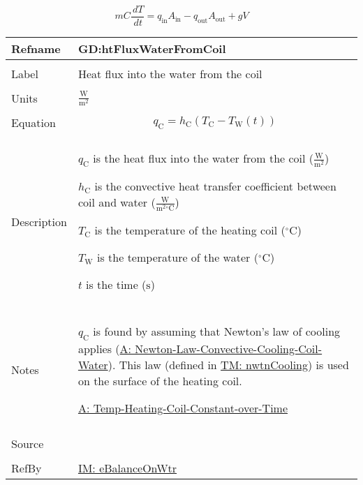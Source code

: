 \documentclass[12pt]{article}
\begin{document}
\begin{displaymath}
m C \frac{\,dT}{\,dt}={q_{\text{in}}} {A_{\text{in}}}-{q_{\text{out}}} {A_{\text{out}}}+g V
\end{displaymath}
\vspace{\baselineskip}
\noindent
\begin{minipage}{\textwidth}
\begin{tabular}{>{\raggedright}p{}>{\raggedright\arraybackslash}p{}}
\toprule \textbf{Refname} & \textbf{GD:htFluxWaterFromCoil}
\label{GD:htFluxWaterFromCoil}
\\ \midrule \\
Label & Heat flux into the water from the coil
        
\\ \midrule \\
Units & $\frac{\text{W}}{\text{m}^{2}}$
        
\\ \midrule \\
Equation & \begin{displaymath}
           {q_{\text{C}}}={h_{\text{C}}} \left({T_{\text{C}}}-{T_{\text{W}}}\left(t\right)\right)
           \end{displaymath}
\\ \midrule \\
Description & \begin{symbDescription}
              \item{${q_{\text{C}}}$ is the heat flux into the water from the coil ($\frac{\text{W}}{\text{m}^{2}}$)}
              \item{${h_{\text{C}}}$ is the convective heat transfer coefficient between coil and water ($\frac{\text{W}}{\text{m}^{2}{}^{\circ}\text{C}}$)}
              \item{${T_{\text{C}}}$ is the temperature of the heating coil (${{}^{\circ}\text{C}}$)}
              \item{${T_{\text{W}}}$ is the temperature of the water (${{}^{\circ}\text{C}}$)}
              \item{$t$ is the time (${\text{s}}$)}
              \end{symbDescription}
\\ \midrule \\
Notes & ${q_{\text{C}}}$ is found by assuming that Newton's law of cooling applies (\hyperref[assumpLCCCW]{A: Newton-Law-Convective-Cooling-Coil-Water}). This law (defined in \hyperref[TM:nwtnCooling]{TM: nwtnCooling}) is used on the surface of the heating coil.
        
        \hyperref[assumpTHCCoT]{A: Temp-Heating-Coil-Constant-over-Time}
        
\\ \midrule \\
Source & \cite{koothoor2013}
         
\\ \midrule \\
RefBy & \hyperref[IM:eBalanceOnWtr]{IM: eBalanceOnWtr}
        
\\ \bottomrule
\end{tabular}
\end{minipage}
\end{document}

